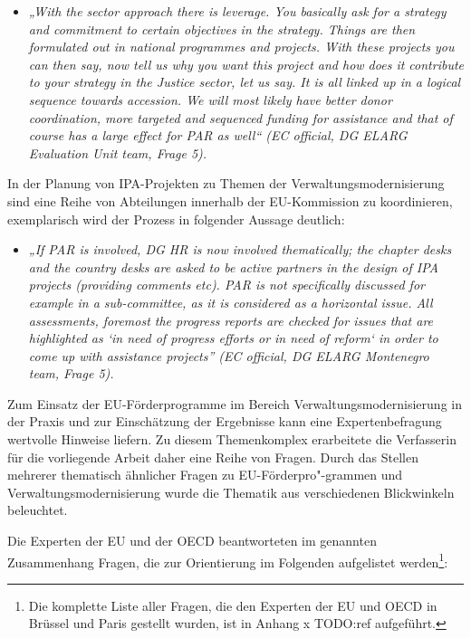 \begin{itemize}[label={}]
\item \textit{„With the sector approach there is leverage. You basically ask for a strategy and commitment to certain objectives in the strategy. Things are then formulated out in national programmes and projects. With these projects you can then say, now tell us why you want this project and how does it contribute to your strategy in the Justice sector, let us say. It is all linked up in a logical sequence towards accession. We will most likely have better donor coordination, more targeted and sequenced funding for assistance and that of course has a large effect for PAR as well“ (EC official, DG ELARG Evaluation Unit team, Frage 5).}
\end{itemize}
In der Planung von IPA-Projekten zu Themen der Verwaltungsmodernisierung sind eine Reihe von Abteilungen innerhalb der EU-Kommission zu koordinieren, exemplarisch wird der Prozess in folgender Aussage deutlich:
\begin{itemize}[label={}]
\item \textit{„If PAR is involved, DG HR is now involved thematically; the chapter desks and the country desks are asked to be active partners in the design of IPA projects (providing comments etc). PAR is not specifically discussed for example in a sub-committee, as it is considered as a horizontal issue. All assessments, foremost the progress reports are checked for issues that are highlighted as `in need of progress efforts or in need of reform` in order to come up with assistance projects” (EC official, DG ELARG Montenegro team, Frage 5).}
\end{itemize}
Zum Einsatz der EU-Förderprogramme im Bereich Verwaltungsmodernisierung in der Praxis und zur Einschätzung der Ergebnisse kann eine Expertenbefragung wertvolle Hinweise liefern. Zu diesem Themenkomplex erarbeitete die Verfasserin für die vorliegende Arbeit daher eine Reihe von Fragen. Durch das Stellen mehrerer thematisch ähnlicher Fragen zu EU-Förderpro"-grammen und Verwaltungsmodernisierung wurde die Thematik aus verschiedenen Blickwinkeln beleuchtet.\par
Die Experten der EU und der OECD beantworteten im genannten Zusammenhang Fragen, die zur Orientierung im Folgenden aufgelistet werden\footnote{Die komplette Liste aller Fragen, die den Experten der EU und OECD in Brüssel und Paris gestellt wurden, ist in Anhang x TODO:ref aufgeführt.}:
